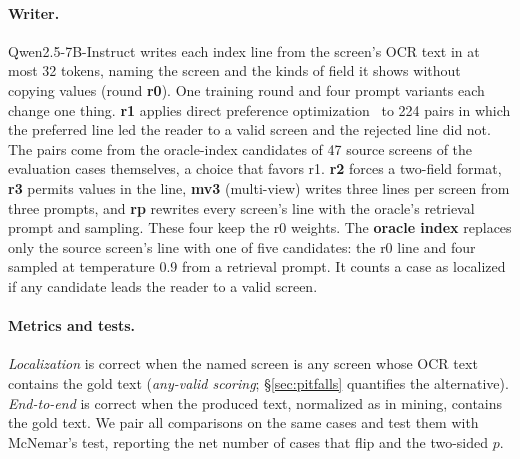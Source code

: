 \paragraph{Writer.}
Qwen2.5-7B-Instruct writes each index line from the screen's OCR text in at most 32 tokens, naming the screen and the kinds of field it shows without copying values (round \textbf{r0}). One training round and four prompt variants each change one thing. \textbf{r1} applies direct preference optimization~\citep{dpo} to 224 pairs in which the preferred line led the reader to a valid screen and the rejected line did not. The pairs come from the oracle-index candidates of 47 source screens of the evaluation cases themselves, a choice that favors r1. \textbf{r2} forces a two-field format, \textbf{r3} permits values in the line, \textbf{mv3} (multi-view) writes three lines per screen from three prompts, and \textbf{rp} rewrites every screen's line with the oracle's retrieval prompt and sampling. These four keep the r0 weights. The \textbf{oracle index} replaces only the source screen's line with one of five candidates: the r0 line and four sampled at temperature 0.9 from a retrieval prompt. It counts a case as localized if any candidate leads the reader to a valid screen.

\paragraph{Metrics and tests.}
\emph{Localization} is correct when the named screen is any screen whose OCR text contains the gold text (\emph{any-valid scoring}; \S\ref{sec:pitfalls} quantifies the alternative). \emph{End-to-end} is correct when the produced text, normalized as in mining, contains the gold text. We pair all comparisons on the same cases and test them with McNemar's test, reporting the net number of cases that flip and the two-sided $p$.
